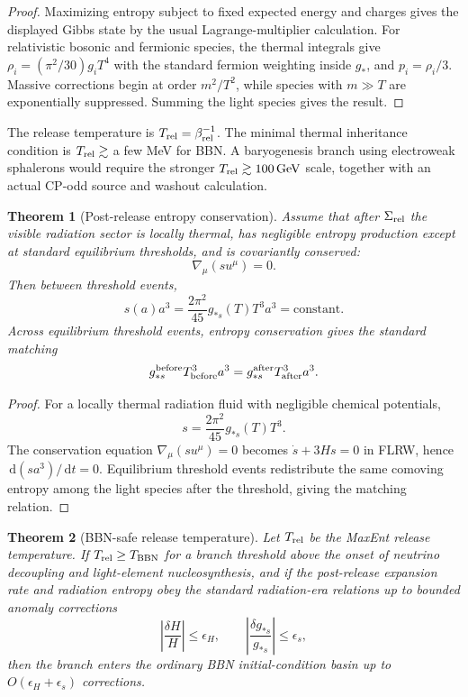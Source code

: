 \documentclass[11pt]{article}
\newtheorem{theorem}{Theorem}[section]
\newcommand{\dd}{\,\mathrm d}
\begin{document}
\begin{proof}
Maximizing entropy subject to fixed expected energy and charges gives the displayed Gibbs state by
the usual Lagrange-multiplier calculation. For relativistic bosonic and fermionic species, the
thermal integrals give \(\rho_i=(\pi^2/30)g_iT^4\) with the standard fermion weighting inside
\(g_\ast\), and \(p_i=\rho_i/3\). Massive corrections begin at order \(m^2/T^2\), while species with
\(m\gg T\) are exponentially suppressed. Summing the light species gives the result.
\end{proof}
The release temperature is \(T_{\rm rel}=\beta_{\rm rel}^{-1}\). The minimal thermal inheritance
condition is \(T_{\rm rel}\gtrsim\) a few MeV for BBN. A baryogenesis branch using electroweak
sphalerons would require the stronger \(T_{\rm rel}\gtrsim100\,\mathrm{GeV}\) scale, together with
an actual CP-odd source and washout calculation.

\begin{theorem}[Post-release entropy conservation]\label{thm:entropy-transport}
Assume that after \(\Sigma_{\rm rel}\) the visible radiation sector is locally thermal, has
negligible entropy production except at standard equilibrium thresholds, and is covariantly
conserved:
\[
\nabla_\mu(su^\mu)=0.
\]
Then between threshold events,
\[
s(a)a^3
=
\frac{2\pi^2}{45}g_{\ast s}(T)T^3a^3
=
\mathrm{constant}.
\]
Across equilibrium threshold events, entropy conservation gives the standard matching
\[
g_{\ast s}^{\rm before}T_{\rm before}^3a^3
=
g_{\ast s}^{\rm after}T_{\rm after}^3a^3.
\]
\end{theorem}

\begin{proof}
For a locally thermal radiation fluid with negligible chemical potentials,
\[
s=\frac{2\pi^2}{45}g_{\ast s}(T)T^3.
\]
The conservation equation \(\nabla_\mu(su^\mu)=0\) becomes \(\dot s+3Hs=0\) in FLRW, hence
\(\dd(sa^3)/\dd t=0\). Equilibrium threshold events redistribute the same comoving entropy among the
light species after the threshold, giving the matching relation.
\end{proof}

\begin{theorem}[BBN-safe release temperature]\label{thm:bbn-safe-release}
Let \(T_{\rm rel}\) be the MaxEnt release temperature. If \(T_{\rm rel}\ge T_{\rm BBN}\) for a branch
threshold above the onset of neutrino decoupling and light-element nucleosynthesis, and if the
post-release expansion rate and radiation entropy obey the standard radiation-era relations up to
bounded anomaly corrections
\[
\left|\frac{\delta H}{H}\right|\le\epsilon_H,
\qquad
\left|\frac{\delta g_{\ast s}}{g_{\ast s}}\right|\le\epsilon_s,
\]
then the branch enters the ordinary BBN initial-condition basin up to
\(O(\epsilon_H+\epsilon_s)\) corrections.
\end{theorem}
\end{document}
